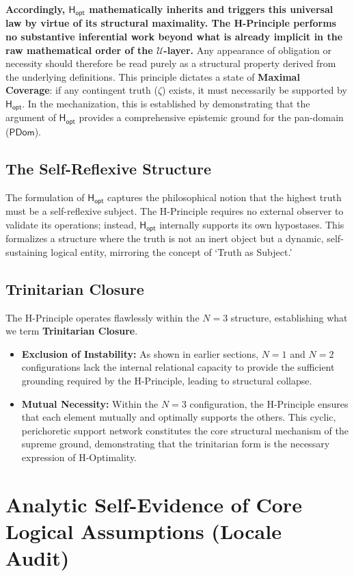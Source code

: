 \documentclass[a4paper, 11pt]{article}
\theoremstyle{plain}
\theoremstyle{definition}
\newcommand{\U}{\mathcal{U}}               %
\newcommand{\Hopt}{\mathsf{H_{opt}}}       %
\newcommand{\PDom}{\mathsf{PDom}}         %
\begin{document}
\textbf{Accordingly, $\Hopt$ mathematically inherits and triggers this universal law by virtue of its structural maximality. The H-Principle performs no substantive inferential work beyond what is already implicit in the raw mathematical order of the $\U$-layer.} Any appearance of obligation or necessity should therefore be read purely as a structural property derived from the underlying definitions. This principle dictates a state of \textbf{Maximal Coverage}: if any contingent truth ($\zeta$) exists, it must necessarily be supported by $\Hopt$. In the mechanization, this is established by demonstrating that the argument of $\Hopt$ provides a comprehensive epistemic ground for the pan-domain ($\PDom$).

\subsection{The Self-Reflexive Structure}
The formulation of $\Hopt$ captures the philosophical notion that the highest truth must be a self-reflexive subject. The H-Principle requires no external observer to validate its operations; instead, $\Hopt$ internally supports its own hypostases. This formalizes a structure where the truth is not an inert object but a dynamic, self-sustaining logical entity, mirroring the concept of `Truth as Subject.'

\subsection{Trinitarian Closure}
The H-Principle operates flawlessly within the $N=3$ structure, establishing what we term \textbf{Trinitarian Closure}.
\begin{itemize}
    \item \textbf{Exclusion of Instability:} As shown in earlier sections, $N=1$ and $N=2$ configurations lack the internal relational capacity to provide the sufficient grounding required by the H-Principle, leading to structural collapse.
    \item \textbf{Mutual Necessity:} Within the $N=3$ configuration, the H-Principle ensures that each element mutually and optimally supports the others. This cyclic, perichoretic support network constitutes the core structural mechanism of the supreme ground, demonstrating that the trinitarian form is the necessary expression of H-Optimality.
\end{itemize}

\section{Analytic Self-Evidence of Core Logical Assumptions (Locale Audit)}
\label{sec:locale_audit}
\end{document}
